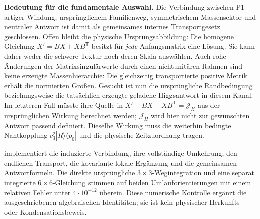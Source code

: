 \begin{center}
\end{center}


\textbf{Bedeutung für die fundamentale Auswahl.}
Die Verbindung zwischen P1-artiger Windung, ursprünglichem Familienweg,
symmetrischem Massensektor und neutraler Antwort ist damit als gemeinsames
internes Transportgesetz geschlossen. Offen bleibt die physische
Ursprungsabbildung: Die homogene Gleichung
$X'=BX+XB^{\mathsf T}$ besitzt für \emph{jede} Anfangsmatrix eine Lösung.
Sie kann daher weder die schwere Textur noch deren Skala auswählen.
Auch rohe Änderungen der Matrixsingulärwerte durch einen nichtunitären
Rahmen sind keine erzeugte Massenhierarchie: Die gleichzeitig transportierte
positive Metrik erhält die normierten Größen.
Gesucht ist nun die ursprüngliche Randbedingung beziehungsweise die
tatsächlich erzeugte geladene Higgsantwort in diesem Kanal. Im letzteren
Fall müsste ihre Quelle in
$X'-BX-XB^{\mathsf T}=\mathcal J_H$
aus der ursprünglichen Wirkung berechnet werden; $\mathcal J_H$ wird hier
nicht zur gewünschten Antwort passend definiert. Dieselbe Wirkung muss
die weiterhin bedingte Nahtkopplung $c_3^2|R\rangle\langle p_0|$ und die
physische Zeitzuordnung tragen.

 implementiert die induzierte
Verbindung, ihre vollständige Umkehrung, den endlichen Transport, die
kovariante lokale Ergänzung und die gemeinsamen Antwortformeln.
Die direkte ursprüngliche $3\times3$-Wegintegration und eine separat
integrierte $6\times6$-Gleichung stimmen auf beiden Umlauforientierungen
mit einem relativen Fehler unter $4\cdot10^{-12}$ überein.
Diese numerische Kontrolle ergänzt die ausgeschriebenen algebraischen
Identitäten; sie ist kein physischer Herkunfts- oder Kondensationsbeweis.

